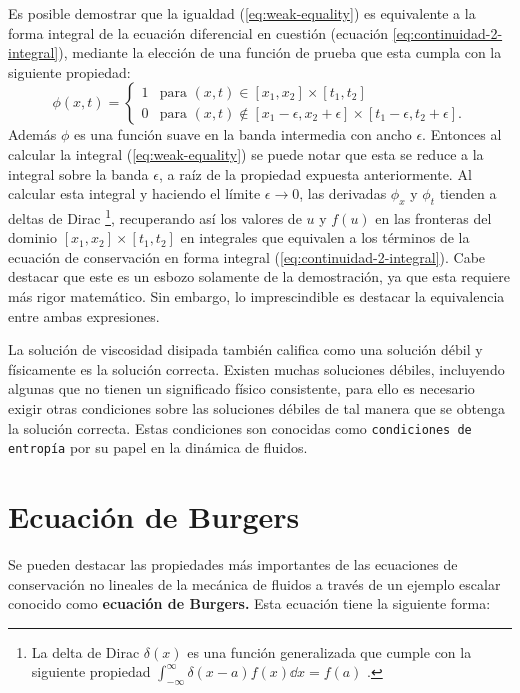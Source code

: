 Es posible demostrar que la igualdad (\ref{eq:weak-equality}) es equivalente a la forma integral de la ecuación diferencial en cuestión (ecuación \ref{eq:continuidad-2-integral}), mediante la elección de una función de prueba que esta cumpla con la siguiente propiedad:
\begin{equation}
	\phi(x,t) = 
	\begin{cases}
		1 & \text{para } (x,t) \in [x_1, x_2] \times [t_1, t_2]\\
		0 & \text{para } (x,t) \notin [x_1 - \epsilon, x_2 + \epsilon] \times [t_1 - \epsilon, t_2 + \epsilon].
 	\end{cases}
\end{equation}
Además $\phi$ es una función suave en la banda intermedia con ancho $\epsilon$. Entonces al calcular la integral (\ref{eq:weak-equality})  se puede notar que esta se reduce a la integral sobre la banda $\epsilon$, a raíz de la propiedad expuesta anteriormente. Al calcular esta integral y haciendo el límite $\epsilon \rightarrow 0$, las derivadas $\phi_x$ y $\phi_t$ tienden a deltas de Dirac \footnote{La delta de Dirac $\delta(x)$ es una función generalizada que cumple con la siguiente propiedad $\int_{-\infty}^{\infty} \delta(x-a) f(x)\dd{x} = f(a)$ \cite{methods}.}, recuperando así los valores de $u$ y $ f(u)$ en las fronteras del dominio $ [x_1, x_2] \times [t_1, t_2]$ en integrales que equivalen a los términos de la ecuación de conservación en forma integral (\ref{eq:continuidad-2-integral}). Cabe destacar que este es un esbozo solamente de la demostración, ya que esta requiere más rigor matemático. Sin embargo, lo imprescindible es destacar la equivalencia entre ambas expresiones.

La solución de viscosidad disipada también califica como una solución débil y físicamente es la solución correcta. Existen muchas soluciones débiles, incluyendo algunas que no tienen un significado físico consistente, para ello es necesario exigir otras condiciones sobre las soluciones débiles de tal manera que se obtenga la solución correcta. Estas condiciones son conocidas como \texttt{condiciones de entropía} por su papel en la dinámica de fluidos.

\section{Ecuación de Burgers}
Se pueden destacar las propiedades más importantes de las ecuaciones de conservación no lineales de la mecánica de fluidos a través de un ejemplo escalar conocido como \textbf{ecuación de Burgers.} Esta ecuación tiene la siguiente forma:

